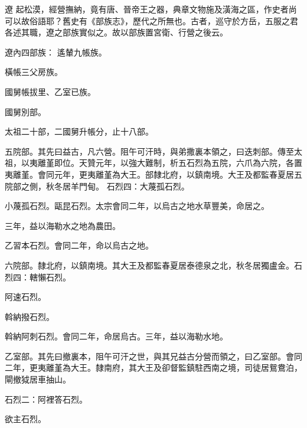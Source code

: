 
\begin{pinyinscope}

 遼
 起松漠，經營撫納，竟有唐、晉帝王之器，典章文物施及潢海之區，作史者尚可以故俗語耶？舊史有《部族志》，歷代之所無也。古者，巡守於方岳，五服之君各述其職，遼之部族實似之。故以部族置宮衛、行營之後云。



 遼內四部族：
 遙輦九帳族。



 橫帳三父房族。



 國舅帳拔里、乙室已族。



 國舅別部。



 太祖二十部，二國舅升帳分，止十八部。



 五院部。其先曰益古，凡六營。阻午可汗時，與弟撒裏本領之，曰迭刺部。傳至太祖，以夷離堇即位。天贊元年，以強大難制，析五石烈為五院，六爪為六院，各置夷離堇。會同元年，更夷離堇為大王。部隸北府，以鎮南境。大王及都監春夏居五院部之側，秋冬居羊門甸。
 石烈四：大蔑孤石烈。



 小蔑孤石烈。甌昆石烈。太宗會同二年，以烏古之地水草豐美，命居之。



 三年，益以海勒水之地為農田。



 乙習本石烈。會同二年，命以烏古之地。



 六院部。隸北府，以鎮南境。其大王及都監春夏居泰德泉之北，秋冬居獨盧金。石烈四：轄懶石烈。



 阿速石烈。



 斡納撥石烈。



 斡納阿刺石烈。會同二年，命居烏古。三年，益以海勒水地。



 乙室部。其先曰撤裏本，阻午可汗之世，與其兄益古分營而領之，曰乙室部。會同二年，更夷離堇為大王。隸南府，其大王及卻督監鎮駐西南之境，司徒居鴛鴦泊，閘撤狘居車抽山。



 石烈二：阿裡答石烈。



 欲主石烈。




\end{pinyinscope}
